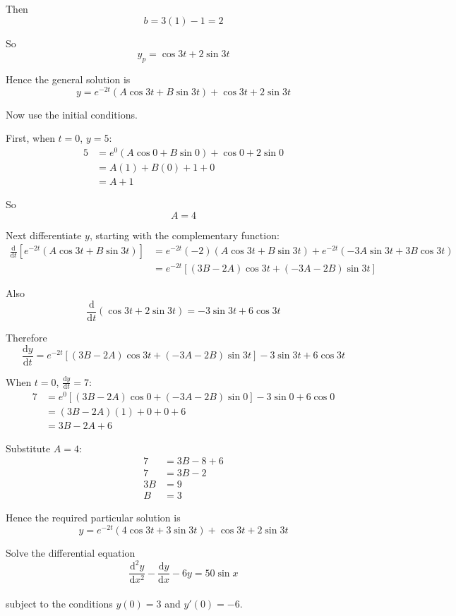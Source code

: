 \documentclass[leqno]{article}
\begin{document}
\begin{enumerate}[
  label=\textbf{\arabic*.},
  leftmargin=*,
  topsep=0pt,
  partopsep=0pt,
  parsep=0pt
]
\begin{djsSolution}
Then
\[
b=3(1)-1=2
\]

So
\[
y_p=\cos 3t+2\sin 3t
\]

Hence the general solution is
\[
y=e^{-2t}(A\cos 3t+B\sin 3t)+\cos 3t+2\sin 3t
\]

Now use the initial conditions.

First, when $t=0$, $y=5$:
\begin{align*}
5&=e^{0}(A\cos 0+B\sin 0)+\cos 0+2\sin 0 \\
&=A(1)+B(0)+1+0 \\
&=A+1
\end{align*}

So
\[
A=4
\]

Next differentiate $y$, starting with the complementary function:
\begin{align*}
\frac{\mathrm{d}}{\mathrm{d}t}\left[e^{-2t}(A\cos 3t+B\sin 3t)\right]
&=e^{-2t}\left(-2\right)(A\cos 3t+B\sin 3t)+e^{-2t}\left(-3A\sin 3t+3B\cos 3t\right) \\
&=e^{-2t}\left[(3B-2A)\cos 3t+(-3A-2B)\sin 3t\right]
\end{align*}

Also
\[
\frac{\mathrm{d}}{\mathrm{d}t}\left(\cos 3t+2\sin 3t\right)=-3\sin 3t+6\cos 3t
\]

Therefore
\[
\frac{\mathrm{d}y}{\mathrm{d}t}=e^{-2t}\left[(3B-2A)\cos 3t+(-3A-2B)\sin 3t\right]-3\sin 3t+6\cos 3t
\]

When $t=0$, $\frac{\mathrm{d}y}{\mathrm{d}t}=7$:
\begin{align*}
7&=e^{0}\left[(3B-2A)\cos 0+(-3A-2B)\sin 0\right]-3\sin 0+6\cos 0 \\
&=(3B-2A)(1)+0+0+6 \\
&=3B-2A+6
\end{align*}

Substitute $A=4$:
\begin{align*}
7&=3B-8+6 \\
7&=3B-2 \\
3B&=9 \\
B&=3
\end{align*}

Hence the required particular solution is
\[
y=e^{-2t}(4\cos 3t+3\sin 3t)+\cos 3t+2\sin 3t
\]
\end{djsSolution}


\newpage

\questionitem

Solve the differential equation \\
\[
\frac{\mathrm{d}^2 y}{\mathrm{d}x^2}-\frac{\mathrm{d}y}{\mathrm{d}x}-6y=50\sin x
\] \\
subject to the conditions $y(0)=3$ and $y'(0)=-6$. 


\end{enumerate}
\end{document}
